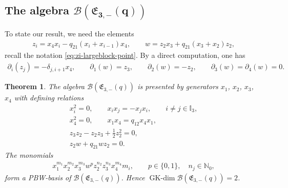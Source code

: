 \documentclass[10pt,a4paper]{amsart}
\numberwithin{equation}{section}
\newtheorem{Theorem}{Theorem}[section]
\newcommand{\GK}{\operatorname{GK-dim}}
\newcommand{\toba}{\mathscr B}
\newcommand{\I}{{\mathbb I}}
\newcommand{\N}{{\mathbb N}}
\newcommand{\eny}{\mathfrak{E}}
\begin{document}
\subsection[The algebra B(E\_{3,-}(q))]{The algebra $\boldsymbol{\toba(\eny_{3,-}(q))}$}
To state our result, we need the elements
\begin{align*}
z_{i} = x_4x_i - q _{21} (x_i+x_{i-1}) x_4,\qquad
w = z_2x_3 + q_{21} (x_3+x_2) z_2,
\end{align*}
recall the notation \eqref{eq:zi-largeblock-point}.
By a direct computation, one has
\begin{align*}
\partial_i(z_{j}) = -\delta_{j,i+1}x_4,\qquad
\partial_1(w) =z_3, \qquad \partial_2(w) =-z_2,\qquad \partial_3(w) =\partial_4(w) =0.
\end{align*}

\begin{Theorem}\label{thm:q=1,q22=-1,n=3} The algebra
$\toba(\eny_{3,-}(q))$ is presented by generators $x_1$,
$x_2$, $x_3$, $x_4$ with defining relations
\begin{gather}\label{eq:endymion3-1-1}
x_i^2=0,\qquad x_ix_j = -x_jx_i, \qquad i\ne j\in\I_3,
\\ \label{eq:endymion3-1-2}
x_4^2=0,\qquad x_1x_4 = q_{12} x_4x_1,
\\ \label{eq:endymion3-1-3}
z_3z_2-z_2z_3+\tfrac{1}{2}z_2^2=0,
\\ \label{eq:endymion3-1-4}
z_2w+q_{21}wz_2=0.
\end{gather}
The monomials
\begin{align}\label{eq:monomials-eny3-}
x_1^{m_1} x_2^{m_2} x_3^{m_3} w^{p} z_2^{n_2}z_{3}^{n_3} x_4^{m_4}
m_i, \qquad p \in \{0,1\}, \quad n_j \in\N_0,
\end{align}
form a PBW-basis of $\toba(\eny_{3,-}(q))$. Hence $\GK \toba(\eny_{3,-}(q)) = 2$.
\end{Theorem}
\end{document}
